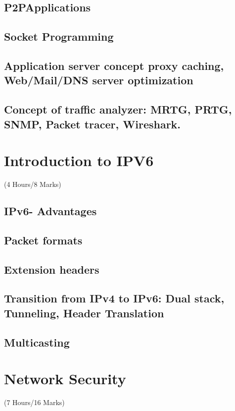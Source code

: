 \documentclass[12pt]{article}
\begin{document}
	\subsection{P2PApplications}
	\subsection{Socket Programming}
	\subsection{Application server concept proxy caching, Web/Mail/DNS server optimization}
	\subsection{Concept of traffic analyzer: MRTG, PRTG, SNMP, Packet tracer, Wireshark.}

	\pagebreak

\section{Introduction to IPV6}
	\begin{center}(4 Hours/8 Marks)\end{center}
	\subsection{IPv6- Advantages}
	\subsection{Packet formats}
	\subsection{Extension headers}
	\subsection{Transition from IPv4 to IPv6: Dual stack, Tunneling, Header Translation}
	\subsection{Multicasting}

	\pagebreak

\section{Network Security}
	\begin{center}(7 Hours/16 Marks)\end{center}
\end{document}
